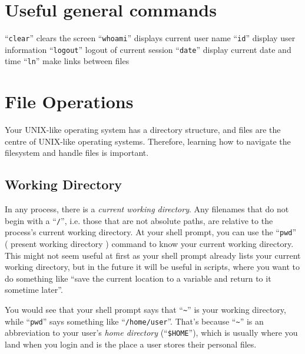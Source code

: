 \documentclass{book}
\begin{document}

\section{Useful general commands}
``\verb|clear|'' clears the screen
``\verb|whoami|'' displays current user name
``\verb|id|''  display user information
``\verb|logout|'' logout of current session
``\verb|date|'' display current date and time
``\verb|ln|'' make links between files

\section{File Operations}

Your UNIX-like operating system has a directory structure, and files are the centre of UNIX-like operating systems. Therefore, learning how to navigate the filesystem and handle files is important.

\subsection{Working Directory}

In any process, there is a \textit{current working directory}. Any filenames that do not begin with a ``\verb|/|'', i.e. those that are not absolute paths, are relative to the process's current working directory. At your shell prompt, you can use the ``\verb|pwd|'' ( present working directory ) command to know your current working directory. This might not seem useful at first as your shell prompt already lists your current working directory, but in the future it will be useful in scripts, where you want to do something like ``save the current location to a variable and return to it sometime later''.

You would see that your shell prompt says that ``\verb|~|'' is your working directory, while ``\verb|pwd|'' says something like ``\verb|/home/user|''. That's because ``\verb|~|'' is an abbreviation to your user's \textit{home directory} (``\verb|$HOME|''), which is usually where you land when you login and is the place a user stores their personal files.
\end{document}
